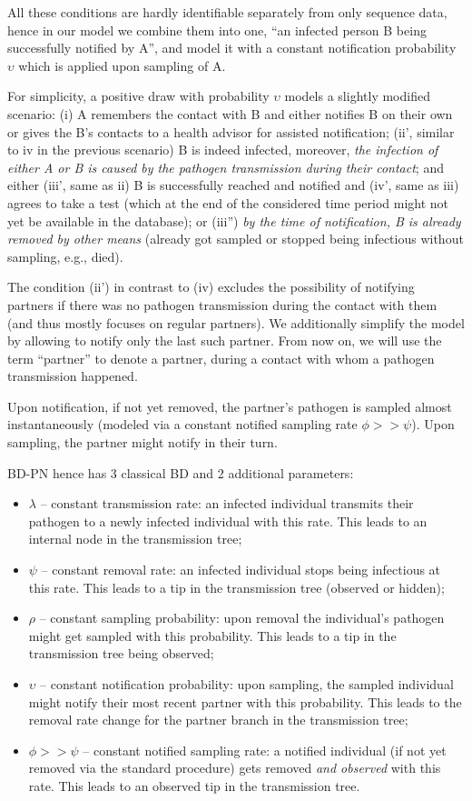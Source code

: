 \documentclass[10pt,letterpaper]{article}
\begin{document}
All these conditions are hardly identifiable separately from only sequence data, hence in our model we combine them into one, ``an infected person B being successfully notified by A'', and model it with a constant notification probability $\upsilon$ which is applied upon sampling of A. 

For simplicity, a positive draw with probability $\upsilon$ models a slightly modified scenario: (i) A remembers the contact with B and  either notifies B on their own or gives the B's contacts to a health advisor for assisted notification; (ii', similar to iv in the previous scenario) B is indeed infected, moreover, \textit{the infection of either A or B is caused by the pathogen transmission during their contact};  and either (iii', same as ii) B is successfully reached and notified and (iv', same as iii) agrees to take a test (which at the end of the considered time period might not yet be available in the database); or (iii'') \textit{by the time of notification, B is already removed by other means} (already got sampled or stopped being infectious without sampling, e.g., died).

The condition (ii') in contrast to (iv) excludes the possibility of notifying partners if there was no pathogen transmission during the contact with them (and thus mostly focuses on regular partners). We additionally simplify the model by allowing to notify only the last such partner. From now on, we will use the term ``partner'' to denote a partner, during a contact with whom a pathogen transmission happened.

Upon notification, if not yet removed,  the partner's pathogen is sampled almost instantaneously (modeled via a constant notified sampling rate $\phi >> \psi$). Upon sampling, the partner might notify in their turn. 

BD-PN hence has 3 classical BD and 2 additional parameters:
\begin{itemize}
 \item $\lambda$ -- constant transmission rate: an infected individual transmits their pathogen to a newly infected individual with this rate. This leads to an internal node in the transmission tree;
 \item $\psi$ -- constant removal rate: an infected individual stops being infectious at this rate. This leads to a tip in the transmission tree (observed or hidden);
 \item $\rho$ -- constant sampling probability: upon removal the individual's pathogen might get sampled with this probability. This leads to a tip in the transmission tree being observed;
 \item $\upsilon$ -- constant notification probability: upon sampling, the sampled individual might notify their most recent partner with this probability. This leads to the removal rate change for the partner branch in the transmission tree;
 \item $\phi >> \psi$ -- constant notified sampling rate: a notified individual (if not yet removed via the standard procedure) gets removed \textit{and observed} with this rate. This leads to an observed tip in the transmission tree. 
\end{itemize}
\end{document}

